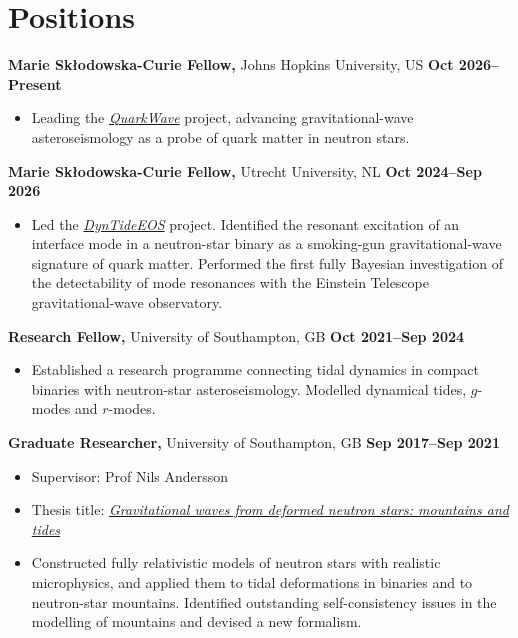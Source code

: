 \section{Positions}

\textbf{Marie Sk{\l}odowska-Curie Fellow,} Johns Hopkins University, US
\hfill \textbf{Oct 2026--Present}%
%
\vspace*{0.05in}
\begin{itemize}
    \item[] Leading the
    \href{https://doi.org/10.3030/101270420}{\textit{QuarkWave}}
    project, advancing gravitational-wave asteroseismology as a probe of quark
    matter in neutron stars.
\end{itemize}

\textbf{Marie Sk{\l}odowska-Curie Fellow,} Utrecht University, NL
\hfill \textbf{Oct 2024--Sep 2026}%
%
\vspace*{0.05in}
\begin{itemize}
    \item[] Led the
    \href{https://doi.org/10.3030/101151301}{\textit{DynTideEOS}}
    project.
    Identified the resonant excitation of an interface mode in a neutron-star
    binary as a smoking-gun gravitational-wave signature of quark matter.
    Performed the first fully Bayesian investigation of the detectability of
    mode resonances with the Einstein Telescope gravitational-wave observatory.
\end{itemize}

\textbf{Research Fellow,} University of Southampton, GB
\hfill \textbf{Oct 2021--Sep 2024}%
%
\vspace*{0.05in}
\begin{itemize}
    \item[] Established a research programme connecting tidal dynamics in
    compact binaries with neutron-star asteroseismology.
    Modelled dynamical tides, $g$-modes and $r$-modes.
\end{itemize}

\textbf{Graduate Researcher,} University of Southampton, GB
\hfill \textbf{Sep 2017--Sep 2021}%
%
\vspace*{0.05in}
\begin{itemize}
    \item[] Supervisor: Prof Nils Andersson
    \item[] Thesis title:
    \href{https://eprints.soton.ac.uk/452900/}%
    {\textit{Gravitational waves from deformed neutron stars: mountains and tides}}
    \item[] Constructed fully relativistic models of neutron stars with
    realistic microphysics, and applied them to tidal deformations in binaries
    and to neutron-star mountains.
    Identified outstanding self-consistency issues in the modelling of
    mountains and devised a new formalism.
\end{itemize}



